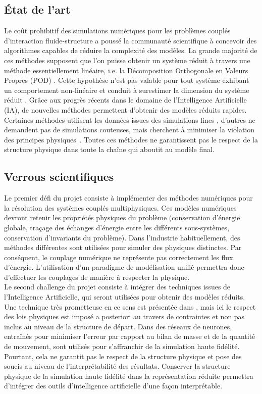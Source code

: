 \documentclass[french]{article}
\begin{document}
\subsection{État de l'art}
Le coût prohibitif des simulations numériques pour les problèmes couplés d'interaction fluide-structure
a poussé la communauté scientifique à concevoir des algorithmes capables de réduire la complexité des modèles. La grande majorité de ces méthodes supposent que l'on puisse obtenir un système réduit à travers une méthode essentiellement linéaire, i.e. la Décomposition Orthogonale en Valeurs Propres (POD) \cite{shinde2019,tello2020fluid}. Cette hypothèse n’est pas valable pour tout
système exhibant un comportement non-linéaire et conduit à surestimer la dimension
du système réduit \cite{kerschen2005}. Grâce aux progrès récents dans le domaine de l’Intelligence
Artificielle (IA), de nouvelles méthodes permettent d’obtenir des modèles réduits rapides. Certaines
méthodes utilisent les données issues des simulations fines \cite{lee2020}, d'autres ne demandent pas de simulations couteuses, mais cherchent à minimiser la violation des principes physiques~\cite{sun2020physics}.  Toutes ces méthodes ne garantissent pas le respect de la structure physique dans toute la chaîne qui aboutit au modèle final. 


\subsection{Verrous scientifiques}


Le premier défi du projet consiste à implémenter des méthodes numériques pour la résolution des systèmes couplés multiphysiques. Ces modèles numériques devront retenir les propriétés physiques du problème (conservation d’énergie globale, traçage des échanges d’énergie entre les différents sous-systèmes, conservation d’invariants du problème). Dans l'industrie habituellement, des méthodes différentes sont utilisées pour simuler des physiques distinctes. Par conséquent, le couplage numérique ne représente pas correctement les flux d’énergie. L’utilisation d’un paradigme de modélisation unifié permettra donc d’effectuer les couplages de manière à respecter la physique. \\

Le second challenge du projet consiste à intégrer des techniques issues de l’Intelligence
Artificielle, qui seront utilisées pour obtenir des modèles réduits. Une technique très prometteuse en ce sens est présentée dans \cite{lee2020}, mais ici le respect des lois physiques est imposé a posteriori au travers de contraintes et non pas inclus au niveau de la structure de départ. Dans \cite{sun2020physics} des réseaux de neurones, entraînés pour minimiser l’erreur par rapport au bilan de masse et de la quantité de mouvement, sont utilisés pour s’affranchir de la simulation haute fidélité. Pourtant, cela ne garantit pas le respect de la structure physique et pose des soucis au niveau de l’interprétabilité des résultats. Conserver la structure physique de la simulation haute fidélité dans la représentation réduite permettra d’intégrer des outils d’intelligence artificielle d’une façon interprétable. \\
\end{document}
